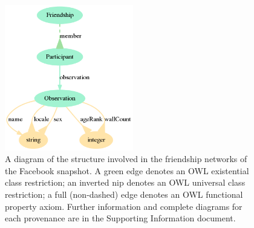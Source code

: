 	\begin{figure}[!ht]
		\centering
			\includegraphics[width=0.5\textwidth]{ontologies/facebook-legacy-AntonioAnzoategui18022013Friendship.ttl/draw}
			    \caption{A diagram of the structure involved in the friendship networks
				of the Facebook snapshot. A green edge denotes an OWL existential class restriction; an inverted nip denotes an OWL universal class restriction; a full (non-dashed) edge denotes an OWL functional property axiom. Further information and complete diagrams for each provenance are in the Supporting Information document.}\label{dia}
	\end{figure}



